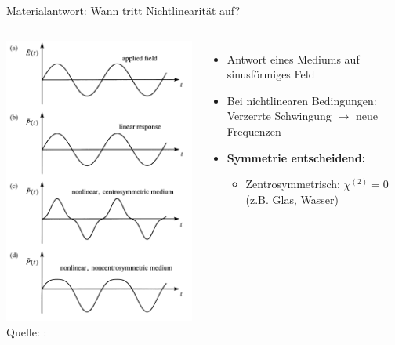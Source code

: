 \documentclass[aspectratio=169]{beamer} %
\newcommand{\figcite}[1]{\\[-3mm]{\tiny Quelle: \cite{#1}}}
\begin{document}
\begin{frame}{Materialantwort: Wann tritt Nichtlinearität auf?}
  \begin{columns}[T,onlytextwidth]
      \includegraphics[height=0.8\textheight]{Images/Nonlinear response.png}
      {\tiny \figcite{Boyd2020}: }
      \begin{itemize}
        \item Antwort eines Mediums auf sinusförmiges Feld
        \pause
        \item Bei nichtlinearen Bedingungen: Verzerrte Schwingung $\rightarrow$ neue Frequenzen
        \item \textbf{Symmetrie entscheidend:}
          \begin{itemize}
            \item Zentrosymmetrisch: $\chi^{(2)} = 0$ (z.B. Glas, Wasser)

\end{itemize}
\end{itemize}
\end{columns}
\end{frame}
\end{document}
